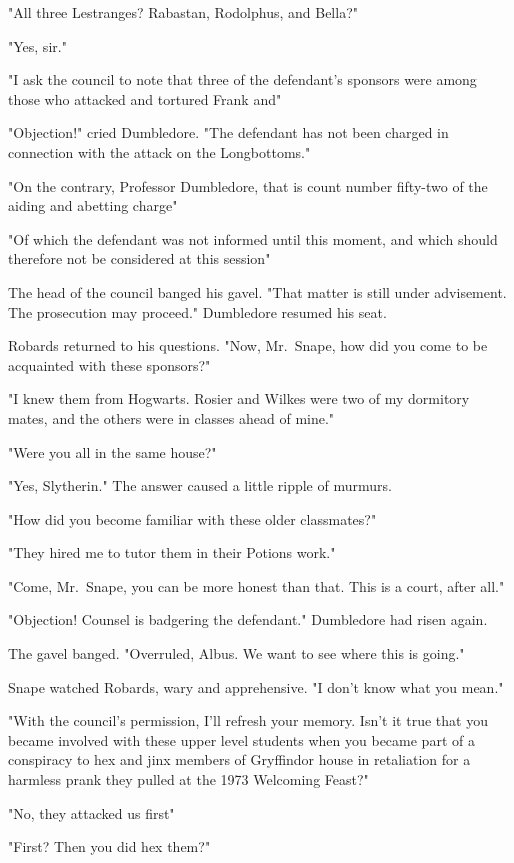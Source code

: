 "All three Lestranges? Rabastan, Rodolphus, and Bella?"

"Yes, sir."

"I ask the council to note that three of the defendant's sponsors were among those who attacked and tortured Frank and{\el}"

"Objection!" cried Dumbledore. "The defendant has not been charged in connection with the attack on the Longbottoms."

"On the contrary, Professor Dumbledore, that is count number fifty-two of the aiding and abetting charge{\el}"

"Of which the defendant was not informed until this moment, and which should therefore not be considered at this session{\el}"

The head of the council banged his gavel. "That matter is still under advisement. The prosecution may proceed." Dumbledore resumed his seat.

Robards returned to his questions. "Now, Mr.~Snape, how did you come to be acquainted with these sponsors?"

"I knew them from Hogwarts. Rosier and Wilkes were two of my dormitory mates, and the others were in classes ahead of mine."

"Were you all in the same house?"

"Yes, Slytherin." The answer caused a little ripple of murmurs.

"How did you become familiar with these older classmates?"

"They hired me to tutor them in their Potions work."

"Come, Mr.~Snape, you can be more honest than that. This is a court, after all."

"Objection! Counsel is badgering the defendant." Dumbledore had risen again.

The gavel banged. "Overruled, Albus. We want to see where this is going."

Snape watched Robards, wary and apprehensive. "I don't know what you mean."

"With the council's permission, I'll refresh your memory. Isn't it true that you became involved with these upper level students when you became part of a conspiracy to hex and jinx members of Gryffindor house in retaliation for a harmless prank they pulled at the 1973 Welcoming Feast?"

"No, they attacked us first{\el}"

"First? Then you did hex them?"

